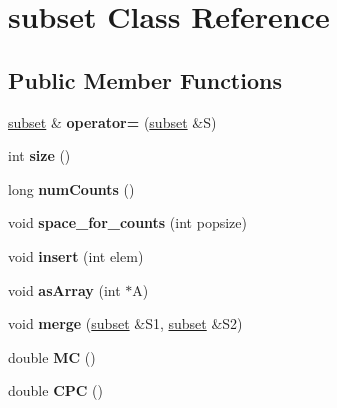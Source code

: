 \hypertarget{classsubset}{\section{subset \-Class \-Reference}
\label{classsubset}
}
\subsection*{\-Public \-Member \-Functions}
\begin{DoxyCompactItemize}
\item 
\hypertarget{classsubset_a94a2e7dc0d6baf663c388f0778d9267f}{\hyperlink{classsubset}{subset} \& {\bfseries operator=} (\hyperlink{classsubset}{subset} \&\-S)}\label{classsubset_a94a2e7dc0d6baf663c388f0778d9267f}

\item 
\hypertarget{classsubset_ab910ec3d841629b42a119a759a02d737}{int {\bfseries size} ()}\label{classsubset_ab910ec3d841629b42a119a759a02d737}

\item 
\hypertarget{classsubset_a0247eeab453b21d501a9ffb09d1fb3aa}{long {\bfseries num\-Counts} ()}\label{classsubset_a0247eeab453b21d501a9ffb09d1fb3aa}

\item 
\hypertarget{classsubset_a97b2092b3624669a81ae71d07cb77db9}{void {\bfseries space\-\_\-for\-\_\-counts} (int popsize)}\label{classsubset_a97b2092b3624669a81ae71d07cb77db9}

\item 
\hypertarget{classsubset_a71deac2c5b358933164cdb3062032dd7}{void {\bfseries insert} (int elem)}\label{classsubset_a71deac2c5b358933164cdb3062032dd7}

\item 
\hypertarget{classsubset_a1e46e99716c6e4021c4e3c7ff20019ad}{void {\bfseries as\-Array} (int $\ast$\-A)}\label{classsubset_a1e46e99716c6e4021c4e3c7ff20019ad}

\item 
\hypertarget{classsubset_a30688ceb63bc2f0d9358c13ec554a667}{void {\bfseries merge} (\hyperlink{classsubset}{subset} \&\-S1, \hyperlink{classsubset}{subset} \&\-S2)}\label{classsubset_a30688ceb63bc2f0d9358c13ec554a667}

\item 
\hypertarget{classsubset_af87edbf55bfcfa0ddd0f2c717242ed01}{double {\bfseries \-M\-C} ()}\label{classsubset_af87edbf55bfcfa0ddd0f2c717242ed01}

\item 
\hypertarget{classsubset_a02093bdb4eb3853a32894def4ba625b8}{double {\bfseries \-C\-P\-C} ()}\label{classsubset_a02093bdb4eb3853a32894def4ba625b8}


\end{DoxyCompactItemize}
